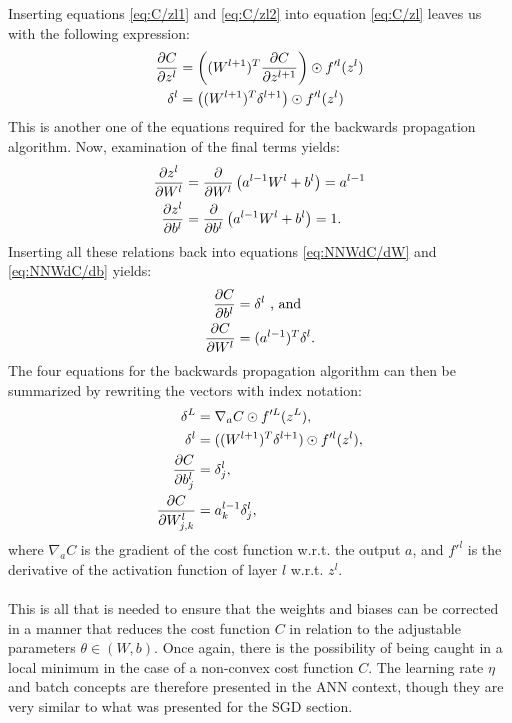             Inserting equations \ref{eq:C/zl1} and \ref{eq:C/zl2} into equation \ref{eq:C/zl} leaves us with the following expression:
            \begin{align}
                \pdv{C}{z^l} &= \left( (W^{l+1})^T \pdv{C}{z^{l+1}}  \right) \odot f'^l(z^l)\\
                \delta^l &= \left( (W^{l+1})^T \delta^{l+1}  \right) \odot f'^l(z^l)
            \end{align}
            This is another one of the equations required for the backwards propagation algorithm. Now, examination of the final terms yields:
            \begin{align}
                \pdv{z^l}{W^l} &= \pdv{}{W^l}\left( a^{l-1}W^l + b^l \right) = a^{l-1}\\
                \pdv{z^l}{b^l} &= \pdv{}{b^l}\left( a^{l-1}W^l + b^l \right) = 1.
            \end{align}
            Inserting all these relations back into equations \ref{eq:NNWdC/dW} and \ref{eq:NNWdC/db} yields:
            \begin{align}
                \pdv{C}{b^l} &= \delta^l \ \text{,  and}\\
                \pdv{C}{W^l} &= (a^{l-1})^T\delta^l.
            \end{align}
            The four equations for the backwards propagation algorithm can then be summarized by rewriting the vectors with index notation:
            \begin{align}
                \delta^L &= \nabla_a C \odot f'^L(z^L), \\
                \delta^l &= ((W^{l+1})^T\delta^{l+1})\odot f'^l(z^l), \\
                \pdv{C}{b^l_j} &= \delta^l_j, \\
                \pdv{C}{W^l_{j,k}} &= a^{l-1}_k\delta^l_j,
            \end{align}
            where $\nabla_aC$ is the gradient of the cost function w.r.t. the output $a$, and $f'^l$ is the derivative of the activation function of layer $l$ w.r.t. $z^l$. \\\\
            This is all that is needed to ensure that the weights and biases can be corrected in a manner that reduces the cost function $C$ in relation to the adjustable parameters $\theta \in \left(W,b\right)$. Once again, there is the possibility of being caught in a local minimum in the case of a non-convex cost function $C$. The learning rate $\eta$ and batch concepts are therefore presented in the ANN context, though they are very similar to what was presented for the SGD section.
            
